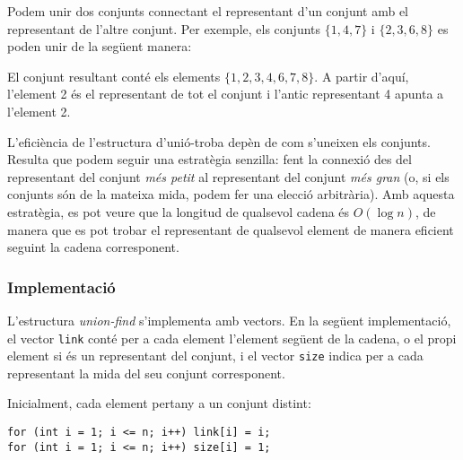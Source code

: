 Podem unir dos conjunts connectant el representant d'un conjunt amb
el representant de l'altre conjunt. Per exemple, els conjunts
$\{1,4,7\}$ i $\{2,3,6,8\}$ es poden unir de la següent manera:
\begin{center}
\end{center}


El conjunt resultant conté els elements $\{1,2,3,4,6,7,8\}$. A partir
d'aquí, l'element 2 és el representant de tot el conjunt i l'antic
representant 4 apunta a l'element 2.

L'eficiència de l'estructura d'unió-troba depèn de com s'uneixen els
conjunts. Resulta que podem seguir una estratègia senzilla: fent la
connexió des del representant del conjunt \emph{més petit} al
representant del conjunt \emph{més gran} (o, si els conjunts són de la
mateixa mida, podem fer una elecció arbitrària). Amb aquesta
estratègia, es pot veure que la longitud de qualsevol cadena és
$O(\log n)$, de manera que es pot trobar el representant de qualsevol
element de manera eficient seguint la cadena corresponent.

\subsubsection{Implementació}

L'estructura \emph{union-find} s'implementa amb vectors. En la següent
implementació, el vector \texttt{link} conté per a cada element
l'element següent de la cadena, o el propi element si és un
representant del conjunt, i el vector \texttt{size} indica per a cada
representant la mida del seu conjunt corresponent.

Inicialment, cada element pertany a un conjunt distint:
\begin{lstlisting}
for (int i = 1; i <= n; i++) link[i] = i;
for (int i = 1; i <= n; i++) size[i] = 1;
\end{lstlisting}


